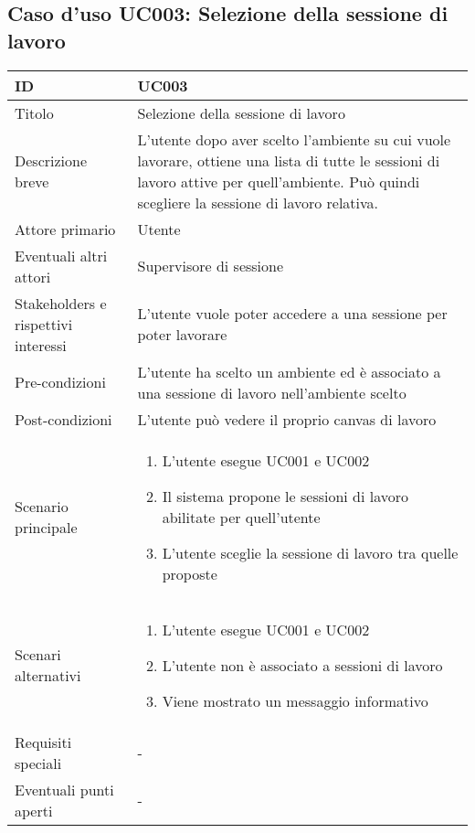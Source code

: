 \documentclass[../../main.tex]{subfiles}
\begin{document}
\subsection{Caso d’uso UC003: Selezione della sessione di lavoro }
\begin{tabularx}{150mm}{|l|X|}
    \hline
    ID                                  & \textbf{UC003}\\
    \hline
    Titolo                              & Selezione della sessione di lavoro \\
    \hline
    Descrizione breve                   & L'utente dopo aver scelto l'ambiente su cui vuole lavorare, ottiene una lista di tutte le sessioni di lavoro attive per quell'ambiente. Può quindi scegliere la sessione di lavoro relativa.   \\
    \hline
    Attore primario                     & Utente   \\
    \hline
    Eventuali altri attori              & Supervisore di sessione   \\
    \hline
    Stakeholders e rispettivi interessi & L'utente vuole poter accedere a una sessione per poter lavorare   \\
    \hline
    Pre-condizioni                      & L'utente ha scelto un ambiente ed è associato a una sessione di lavoro nell'ambiente scelto   \\
    \hline
    Post-condizioni                     & L'utente può vedere il proprio canvas di lavoro   \\
    \hline
    Scenario principale                 & \begin{enumerate}
        \item L'utente esegue UC001 e UC002
        \item Il sistema propone le sessioni di lavoro abilitate per quell'utente
        \item L'utente sceglie la sessione di lavoro tra quelle proposte
    \end{enumerate} \\
    \hline
    Scenari alternativi &
    \begin{enumerate}
        \item L'utente esegue UC001 e UC002
        \item L'utente non è associato a sessioni di lavoro
        \item Viene mostrato un messaggio informativo
    \end{enumerate}
        \\
    \hline
    Requisiti speciali                  & -   \\
    \hline
    Eventuali punti aperti              & -   \\
    \hline
\end{tabularx}
\newpage
\end{document}
